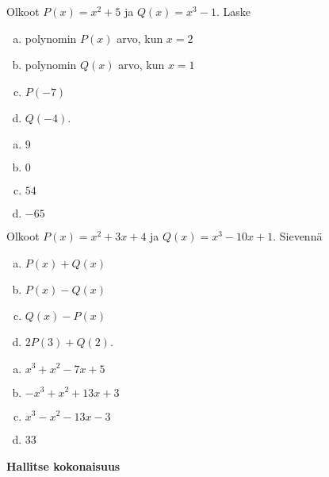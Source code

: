 \begin{tehtavasivu}
\begin{tehtava}
    Olkoot $P(x)=x^2+5$ ja $Q(x)=x^3-1$. Laske
    \begin{enumerate}[a)]
        \item polynomin $P(x)$ arvo, kun $x=2$
        \item polynomin $Q(x)$ arvo, kun $x=1$
        \item $P(-7)$
        \item $Q(-4)$.
    \end{enumerate}
    \begin{vastaus}
        \begin{enumerate}[a)]
            \item $9$ %
            \item $0$ %
            \item $54$ %
            \item $-65$ %
        \end{enumerate}
    \end{vastaus}
\end{tehtava}

\begin{tehtava}
    Olkoot $P(x)=x^2+3x+4$ ja $Q(x)=x^3-10x+1$. Sievennä
    \begin{enumerate}[a)]
        \item $P(x)+Q(x)$
        \item $P(x)-Q(x)$
        \item $Q(x)-P(x)$
        \item $2P(3)+Q(2)$.
    \end{enumerate}
    \begin{vastaus}
        \begin{enumerate}[a)]
            \item $x^3+x^2-7x+5$ %
            \item $-x^3+x^2+13x+3$ %
            \item $x^3-x^2-13x-3$ %
            \item $33$ %
        \end{enumerate}
    \end{vastaus}
\end{tehtava}



\paragraph*{Hallitse kokonaisuus}


\end{tehtavasivu}
